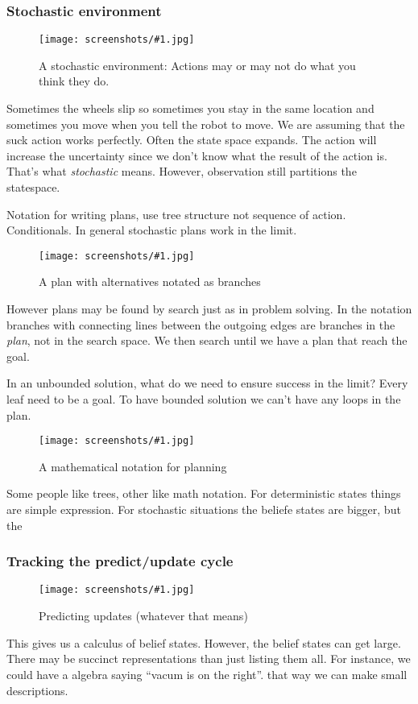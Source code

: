 \documentclass[a4, 12pt, english, USenglish]{scrreprt}
\newcommand{\screenshot}[2]{
\begin{figure}[htb]
\texttt{[image: screenshots/\#1.jpg]}
\label{#1}
\caption{#2}
\end{figure}}
\newcommand{\idx}[1]{{\em #1}\index{#1}}
\begin{document}
\subsubsection{Stochastic environment}

\screenshot{stochasticenv}{A stochastic environment: Actions may or
  may not do what you think they do.}

Sometimes the wheels slip so sometimes you stay in the same location
and sometimes you move when you tell the robot to move. We are
assuming that the suck action works perfectly.  Often the state space
expands.  The action will increase the uncertainty since we don't know
what the result of the action is.  That's what \idx{stochastic}
means.  However, observation still partitions the statespace.

Notation for writing plans, use tree structure not sequence of
action.  Conditionals.  In general stochastic plans work in the limit.


\screenshot{branchingplan}{A plan with alternatives notated as branches}

However plans may be found by search just as in problem solving.  In
the notation branches with connecting lines between the outgoing edges
are branches in the {\em plan}, not in the search space.  We then
search until we have a plan that reach the goal.

In an unbounded solution, what do we need to ensure success in the
limit?  Every leaf need to be a goal.  To have  bounded solution we
can't have any loops in the plan.

\screenshot{mathnotation}{A mathematical notation for planning}

Some people like trees, other like math notation. For deterministic
states things are simple expression.  For stochastic situations the
beliefe states are bigger, but the 


\subsubsection{Tracking the predict/update cycle}

\screenshot{predictupdate}{Predicting updates (whatever that means)}

This gives us a calculus of belief states.  However, the belief states
can get large.  There may be succinct representations than just
listing them all.  For instance, we could have a algebra saying
``vacum is on the right''.  that way we can make small descriptions.
\end{document}
